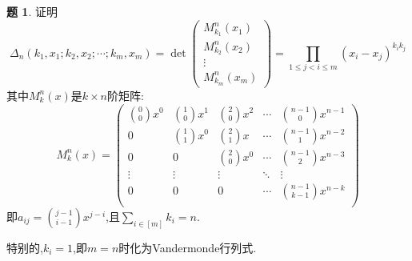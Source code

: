 \documentclass{article}
\theoremstyle{definition}
\newtheorem{exercise}{题}[section]
\begin{document}
\begin{exercise}
    证明$$\Delta_n(k_1,x_1;k_2,x_2;\cdots;k_m,x_m)=\det\begin{pmatrix}
        M^n_{k_1}(x_1)\\M^n_{k_2}(x_2)\\\vdots\\M^n_{k_m}(x_m)
    \end{pmatrix}=\prod_{1\leq j< i\leq m}(x_i-x_j)^{k_ik_j}$$
    其中$M^n_k(x)$是$k\times n$阶矩阵:
    $$M^n_k(x)=\begin{pmatrix}
        \binom{0}{0}x^0&\binom{1}{0}x^1&\binom{2}{0}x^2&\cdots&\binom{n-1}{0}x^{n-1}\\
        0&\binom{1}{1}x^0&\binom{2}{1}x&\cdots&\binom{n-1}{1}x^{n-2}\\
        0&0&\binom{2}{0}x^{0}&\cdots&\binom{n-1}{2}x^{n-3}\\
        \vdots&\vdots&\vdots&\ddots&\vdots\\
        0&0&0&\cdots&\binom{n-1}{k-1}x^{n-k}\\
    \end{pmatrix}$$
    即$ a_{ij}=\binom{j-1}{i-1}x^{j-i}$,且$ \sum_{i\in [m]}k_i=n$.
    
    特别的,$k_i=1$,即$m=n$时化为Vandermonde行列式.
\end{exercise}
\end{document}
